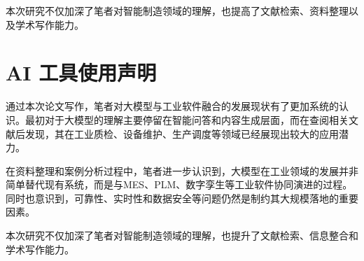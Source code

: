 \documentclass[12pt,a4paper]{ctexart}
\begin{document}
本次研究不仅加深了笔者对智能制造领域的理解，也提高了文献检索、资料整理以及学术写作能力。

\printbibliography[heading=bibintoc]

\section*{AI 工具使用声明}
通过本次论文写作，笔者对大模型与工业软件融合的发展现状有了更加系统的认识。最初对于大模型的理解主要停留在智能问答和内容生成层面，而在查阅相关文献后发现，其在工业质检、设备维护、生产调度等领域已经展现出较大的应用潜力。

在资料整理和案例分析过程中，笔者进一步认识到，大模型在工业领域的发展并非简单替代现有系统，而是与MES、PLM、数字孪生等工业软件协同演进的过程。同时也意识到，可靠性、实时性和数据安全等问题仍然是制约其大规模落地的重要因素。

本次研究不仅加深了笔者对智能制造领域的理解，也提升了文献检索、信息整合和学术写作能力。
\end{document}
